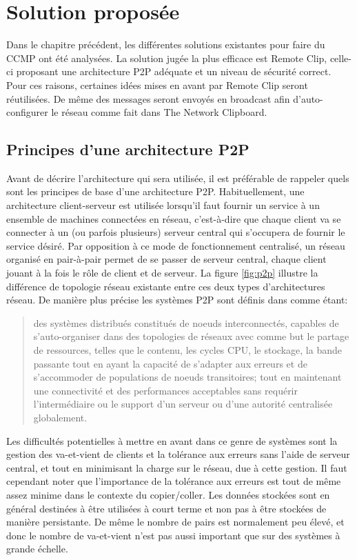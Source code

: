 \chapter{Solution proposée}
\renewcommand{\leftmark}{\thechapter.~~Solution}
Dans le chapitre précédent, les différentes solutions existantes pour faire
du CCMP ont été analysées. La solution jugée la plus efficace
est Remote Clip, celle-ci proposant une architecture P2P adéquate et un
niveau de sécurité correct. Pour ces raisons, certaines idées mises en avant
par Remote Clip seront réutilisées. De même des messages seront envoyés en
broadcast afin d'auto-configurer le réseau comme fait dans The Network
Clipboard.

\section{Principes d'une architecture P2P}\label{sec:p2p}
Avant de décrire l'architecture qui sera utilisée, il est préférable
de rappeler quels sont les principes de base d'une architecture P2P.
Habituellement, une architecture client-serveur est utilisée lorsqu'il
faut fournir un service à un ensemble de machines connectées en réseau,
c'est-à-dire que chaque client va se connecter à un (ou parfois plusieurs)
serveur central qui s'occupera de fournir le service désiré. Par opposition à
ce mode de fonctionnement centralisé, un réseau organisé en pair-à-pair
permet de se passer de serveur central, chaque client jouant à la fois le rôle
de client et de serveur. La figure \ref{fig:p2p} illustre la différence
de topologie réseau existante entre ces deux types d'architectures réseau.
De manière plus précise les systèmes P2P sont définis dans \cite{AS04} comme
étant:
\begin{quote}
  des systèmes distribués constitués de noeuds interconnectés, capables de
  s'auto-organiser dans des topologies de réseaux avec comme but le partage
  de ressources, telles que le contenu, les cycles CPU, le stockage,
  la bande passante tout en ayant la capacité de s'adapter aux erreurs et
  de s'accommoder de populations de noeuds transitoires; tout en maintenant
  une connectivité et des performances acceptables sans requérir
  l'intermédiaire ou le support d'un serveur ou d'une autorité
  centralisée globalement.
\end{quote}

Les difficultés potentielles à mettre en avant dans ce genre de systèmes
sont la gestion des va-et-vient de clients et la tolérance aux erreurs
sans l'aide de serveur central, et tout en minimisant la charge sur le réseau,
due à cette gestion. Il faut cependant noter que l'importance de la tolérance
aux erreurs est tout de même assez minime dans le contexte du copier/coller.
Les données stockées sont en général destinées à être utilisées à court terme
et non pas à être stockées de manière persistante. De même le nombre de pairs
est normalement peu élevé, et donc le nombre de va-et-vient n'est pas aussi
important que sur des systèmes à grande échelle.


